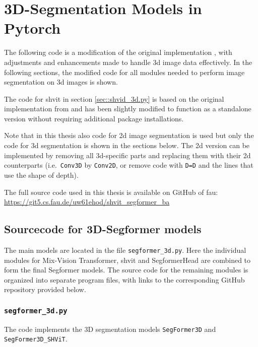 \chapter{3D-Segmentation Models in Pytorch} \label{code_implementation}
The following code is a modification of the original implementation \cite{IMvision12}, with adjustments and enhancements made to handle \gls{3d} image data effectively. In the following sections, the modified code for all modules needed to perform image segmentation on \gls{3d} images is shown.

\medskip

The code for \gls{shvit} in section \ref{sec::shvid_3d.py} is based on the original implementation from \cite{github_shvit} and has been slightly modified to function as a standalone version without requiring additional package installations. 

\medskip

Note that in this thesis also code for \gls{2d} image segmentation is used but only the code for \gls{3d} segmentation is shown in the sections below. The \gls{2d} version can be implemented by removing all \gls{3d}-specific parts and replacing them with their \gls{2d} counterparts (i.e.~{\tt Conv3D} by {\tt Conv2D}, or remove code with {\tt D=D} and the lines that use the shape of depth).

\medskip

The full source code used in this thesis is available on GitHub of \gls{fau}: \url{https://git5.cs.fau.de/uw61ehod/shvit_segformer_ba}


\section{Sourcecode for 3D-Segformer models} \label{sec::segformer_main}
The main models are located in the file {\tt segformer\_3d.py}. Here the individual modules for Mix-Vision Transformer, \gls{shvit} and SegformerHead are combined to form the final Segformer models. The source code for the remaining modules is organized into separate program files, with links to the corresponding GitHub repository provided below.


\subsection{{\tt segformer\_3d.py}}
The code implements the 3D segmentation models {\tt SegFormer3D} and {\tt SegFormer3D\_SHViT}. 

\medskip

